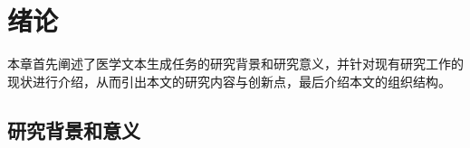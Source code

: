
\chapter{绪论}

本章首先阐述了医学文本生成任务的研究背景和研究意义，并针对现有研究工作的现状进行介绍，从而引出本文的研究内容与创新点，最后介绍本文的组织结构。

\section{研究背景和意义}



%
%
%
